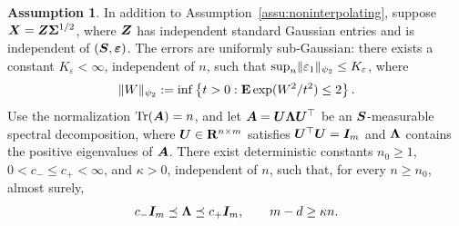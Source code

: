 \documentclass{article}
\theoremstyle{plain} %
\theoremstyle{definition} %
\newtheorem{assumption}[theorem]{Assumption}
\theoremstyle{definition} %
\begin{document}
\begin{assumption}
\label{assu:Gaussian-Stein-design}
In addition to Assumption~\ref{assu:noninterpolating}, suppose
$\boldsymbol{X}=\boldsymbol{Z}\boldsymbol{\Sigma}^{1/2}$, where $\boldsymbol{Z}$ has independent standard Gaussian
entries and is independent of $(\boldsymbol{S},{\boldsymbol{\varepsilon} })$.
The errors are uniformly sub-Gaussian: there exists a constant
$K_\varepsilon<\infty$, independent of $n$, such that
$\sup_n\lVert\varepsilon_1\rVert_{\psi_2}\leq K_\varepsilon$, where
\begin{align*}
    \lVert W\rVert_{\psi_2}
    :=\inf\left\{t>0:{\mathbf{E}}\exp(W^2/t^2)\leq2\right\}.
\end{align*}
Use the normalization $\operatorname{Tr}(\boldsymbol{A})=n$, and let
$\boldsymbol{A}=\boldsymbol{U}\boldsymbol{\Lambda}\boldsymbol{U}^\top$ be an $\boldsymbol{S}$-measurable spectral
decomposition, where $\boldsymbol{U}\in{\mathbf{R}}^{n\times m}$ satisfies
$\boldsymbol{U}^\top\boldsymbol{U}=\boldsymbol{I}_m$ and $\boldsymbol{\Lambda}$ contains the positive eigenvalues
of $\boldsymbol{A}$. There exist deterministic constants $n_0\geq1$,
$0<c_-\leq c_+<\infty$, and $\kappa>0$, independent of $n$, such
that, for every $n\geq n_0$, almost surely,
\begin{align}
    c_-\boldsymbol{I}_m\preceq\boldsymbol{\Lambda}\preceq c_+\boldsymbol{I}_m,
    \qquad
    m-d\geq\kappa n.
    \label{eq:balanced-sketch-conditions}
\end{align}

\end{assumption}
\end{document}

